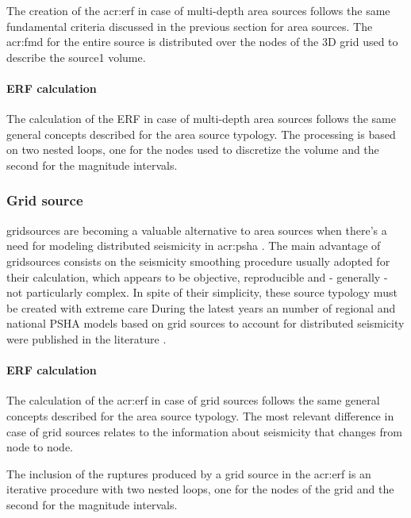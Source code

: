The creation of the \gls{acr:erf} in case of multi-depth area sources
follows the same fundamental criteria discussed in the previous section 
for area sources. 
%
The \gls{acr:fmd} for the entire source is distributed over the nodes 
of the 3D grid used to describe the source1 volume.
%
\paragraph{ERF calculation}
The calculation of the ERF in case of multi-depth area sources follows
the same general concepts described for the area source typology.
%
The processing is based on two nested loops, one for the nodes 
used to discretize the volume and the second for the magnitude intervals. 
%
\subsubsection{Grid source}
\Glspl{gridsource} are becoming a valuable alternative
to area sources when there's a need for modeling distributed 
seismicity in \gls{acr:psha} \citep{frankel1995}. 
%
The main advantage of \glspl{gridsource} consists on the seismicity 
smoothing procedure usually adopted for their calculation, which appears
to be objective, reproducible and - generally - not particularly complex. 
%
In spite of their simplicity, these source typology must be created 
with extreme care \citep[][page 9]{abrahamson2006}
%
During the latest years an number of regional and national PSHA models 
based on grid sources to account for distributed seismicity were 
published in the literature \citep{stirling2002,petersen2008}. 
%
\paragraph{ERF calculation}
The calculation of the \gls{acr:erf} in case of grid sources follows 
the same general concepts described for the area source typology.
The most relevant difference in case of grid sources relates to the 
information about seismicity that changes from node to node.

The inclusion of the ruptures produced by a grid source in the 
\gls{acr:erf} is an iterative procedure with two nested loops, one 
for the nodes of the grid and the second for the magnitude intervals. 
%
